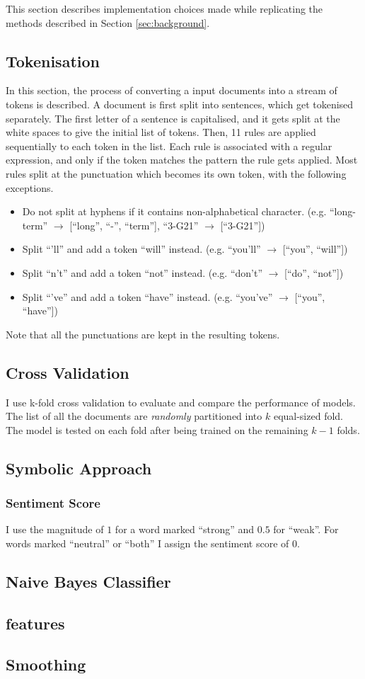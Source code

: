 This section describes implementation choices made while replicating the methods described in Section \ref{sec:background}.
\subsection{Tokenisation}
In this section, the process of converting a input documents into a stream of tokens is described.
A document is first split into sentences, which get tokenised separately.
The first letter of a sentence is capitalised, and it gets split at the white spaces to give the initial list of tokens.
Then, 11 rules are applied sequentially to each token in the list. Each rule is associated with a regular expression, and only if the token matches the pattern the rule gets applied. Most rules split at the punctuation which becomes its own token, with the following exceptions.
\begin{itemize}
\item Do not split at hyphens if it contains non-alphabetical character.
(e.g. ``long-term'' $\rightarrow$ [``long'', ``-'', ``term''], ``3-G21'' $\rightarrow$ [``3-G21''])
\item Split ``'ll'' and add a token ``will'' instead.
(e.g. ``you'll'' $\rightarrow$ [``you'', ``will''])
\item Split ``n't'' and add a token ``not'' instead.
(e.g. ``don't'' $\rightarrow$ [``do'', ``not''])
\item Split ``'ve'' and add a token ``have'' instead.
(e.g. ``you've'' $\rightarrow$ [``you'', ``have''])
\end{itemize}
Note that all the punctuations are kept in the resulting tokens.
\subsection{Cross Validation}
I use k-fold cross validation to evaluate and compare the performance of models.
The list of all the documents are {\em randomly} partitioned into $k$ equal-sized fold.
The model is tested on each fold after being trained on the remaining $k-1$ folds.
\subsection{Symbolic Approach}
\subsubsection{Sentiment Score}
I use the magnitude of $1$ for a word marked ``strong'' and $0.5$ for ``weak''. For words marked ``neutral'' or ``both'' I assign the sentiment score of $0$.
\subsection{Naive Bayes Classifier}
\subsection{features}
\subsection{Smoothing}
